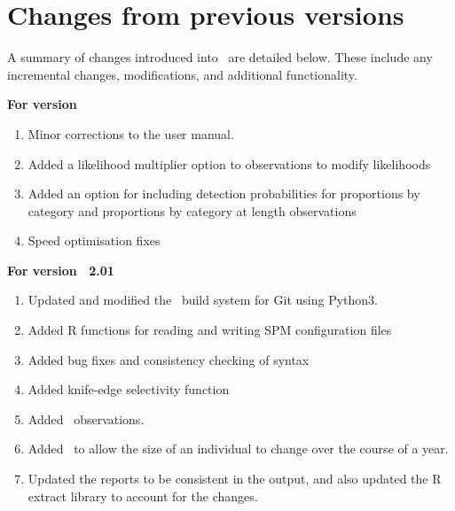\section{Changes from previous versions}

A summary of changes introduced into \SPM\ are detailed below. These include any incremental changes, modifications, and additional functionality.

\textbf{For version \SPM\ \VER}

\begin{enumerate}
  \item Minor corrections to the user manual.
	\item Added a likelihood multiplier option to observations to modify likelihoods
	\item Added an option for including detection probabilities for proportions by category and proportions by category at length observations
	\item Speed optimisation fixes
\end{enumerate}

\textbf{For version \SPM\ 2.01}

\begin{enumerate}
  \item Updated and modified the \SPM\ build system for Git using Python3.
  \item Added R functions for reading and writing SPM configuration files
	\item Added bug fixes and consistency checking of syntax
	\item Added knife-edge selectivity function
  \item Added\   observations.
  \item Added\   to allow the size of an individual to change over the course of a year.	
  \item Updated the reports to be consistent in the output, and also updated the R extract library to account for the changes.
\end{enumerate}


